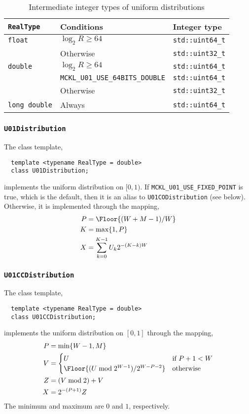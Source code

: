 \begin{table}
  \begin{tabularx}{\textwidth}{LlL}
    \toprule
    \verb|RealType| & Conditions & Integer type \\
    \midrule
    \verb|float|  & $\log_2 R \ge 64$   & \verb|std::uint64_t| \\
                  & Otherwise           & \verb|std::uint32_t| \\
    \verb|double| & $\log_2 R \ge 64$   & \verb|std::uint64_t| \\
    & \verb|MCKL_U01_USE_64BITS_DOUBLE| & \verb|std::uint64_t| \\
    & Otherwise                         & \verb|std::uint32_t| \\
    \verb|long double| & Always         & \verb|std::uint64_t| \\
    \bottomrule
  \end{tabularx}
  \caption{Intermediate integer types of uniform distributions}
  \label{tab:Intermediate integer types of uniform distributions}
\end{table}

\subsubsection{\texttt{U01Distribution}}

The class template,
\begin{Verbatim}
  template <typename RealType = double>
  class U01Distribution;
\end{Verbatim}
implements the uniform distribution on $[0, 1)$. If
\verb|MCKL_U01_USE_FIXED_POINT| is true, which is the default, then it is an
alias to \verb|U01CODistribution| (see below). Otherwise, it is implemented
through the mapping,
\begin{align*}
  P &= \Floor{(W + M - 1) / W} \\
  K &= \max\{1, P\} \\
  X &= \sum_{k=0}^{K - 1} U_k 2^{-(K - k)W}
\end{align*}

\subsubsection{\texttt{U01CCDistribution}}

The class template,
\begin{Verbatim}
  template <typename RealType = double>
  class U01CCDistribution;
\end{Verbatim}
implements the uniform distribution on $[0, 1]$ through the mapping,
\begin{align*}
  P &= \min\{W - 1, M\} \\
  V &= \begin{cases}
    U &\text{if } P + 1 < W \\
    \Floor{(U \bmod 2^{W - 1}) / 2^{W - P -2}} &\text{otherwise}
  \end{cases} \\
  Z &= (V \bmod 2) + V \\
  X &= 2^{-(P + 1)} Z
\end{align*}
The minimum and maximum are $0$ and $1$, respectively.

